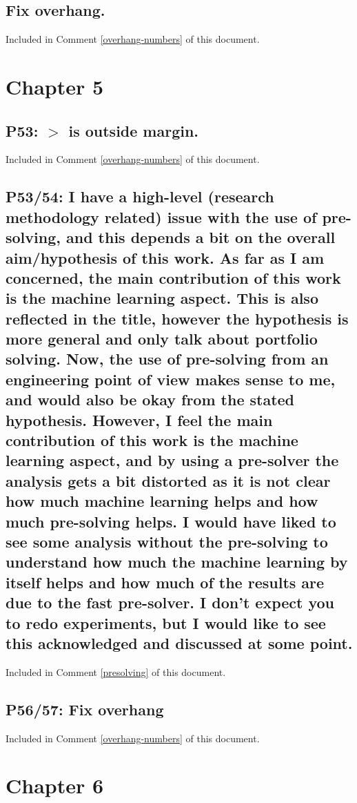 \documentclass[]{article}
\begin{document}
\subsection{Fix overhang.}

Included in Comment \ref{overhang-numbers} of this document.

\section{Chapter 5}

\subsection{P53: $>$ is outside margin.}

Included in Comment \ref{overhang-numbers} of this document.

\subsection{P53/54: I have a high-level (research methodology related) issue with the use of pre-solving, and this depends a bit on the overall aim/hypothesis of this work. As far as I am concerned, the main contribution of this work is the machine learning aspect. This is also reflected in the title, however the hypothesis is more general and only talk about portfolio solving. Now, the use of pre-solving from an engineering point of view makes sense to me, and would also be okay from the stated hypothesis. However, I feel the main contribution of this work is the machine learning aspect, and by using a pre-solver the analysis gets a bit distorted as it is not clear how much machine learning helps and how much pre-solving helps. I would have liked to see some analysis without the pre-solving to understand how much the machine learning by itself helps and how much of the results are due to the fast pre-solver. I don't expect you to redo experiments, but I would like to see this acknowledged and discussed at some point.}

Included in Comment \ref{presolving} of this document.

\subsection{P56/57: Fix overhang}

Included in Comment \ref{overhang-numbers} of this document.

\section{Chapter 6}
\end{document}
